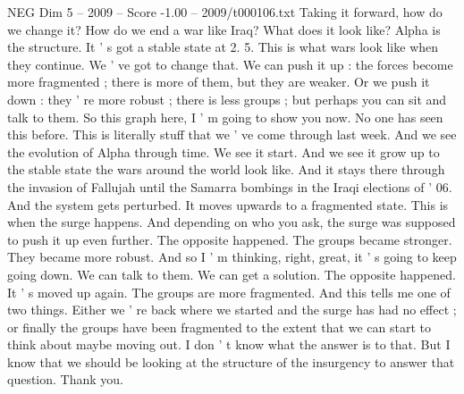 \begin{textsample}{NEG Dim 5 – 2009 – Score -1.00 – 2009/t000106.txt}
Taking it forward, how do we change it?
How do we end a war like Iraq?
What does it look like?
Alpha is the structure.
It ' s got a stable state at 2. 5.
This is what wars look like when they continue.
We ' ve got to change that.
We can push it up : the forces become more fragmented ; there is more of them, but they are weaker.
Or we push it down : they ' re more robust ; there is less groups ; but perhaps you can sit and talk to them.
So this graph here, I ' m going to show you now.
No one has seen this before.
This is literally stuff that we ' ve come through last week.
And we see the evolution of Alpha through time.
We see it start.
And we see it grow up to the stable state the wars around the world look like.
And it stays there through the invasion of Fallujah until the Samarra bombings in the Iraqi elections of ' 06.
And the system gets perturbed.
It moves upwards to a fragmented state.
This is when the surge happens.
And depending on who you ask, the surge was supposed to push it up even further.
The opposite happened.
The groups became stronger.
They became more robust.
And so I ' m thinking, right, great, it ' s going to keep going down.
We can talk to them.
We can get a solution.
The opposite happened.
It ' s moved up again.
The groups are more fragmented.
And this tells me one of two things.
Either we ' re back where we started and the surge has had no effect ; or finally the groups have been fragmented to the extent that we can start to think about maybe moving out.
I don ' t know what the answer is to that.
But I know that we should be looking at the structure of the insurgency to answer that question.
Thank you.

\end{textsample}
